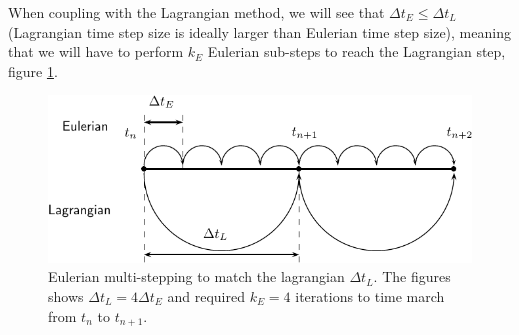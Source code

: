 When coupling with the Lagrangian method, we will see that $\Delta t_E \leqslant \Delta t_L$ (Lagrangian time step size is ideally larger than Eulerian time step size), meaning that we will have to perform $k_E$ Eulerian sub-steps to reach the Lagrangian step, figure \ref{fig:multiStep}.

	\begin{figure}[t]
	\centering
	\includegraphics[width=0.7\linewidth]{./figures/eulerian/multiStep-crop.pdf}
	\caption{Eulerian multi-stepping to match the lagrangian $\Delta t_L$. The figures shows $\Delta t_L = 4 \Delta t_E$ and required $k_E = 4$ iterations to time march from $t_n$ to $t_{n+1}$.}
	\label{fig:multiStep}
	\end{figure}	




%	







	
